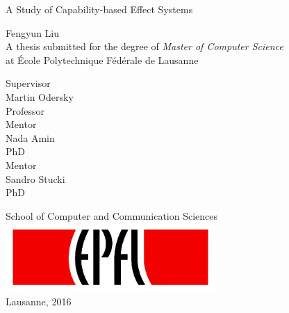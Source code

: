 \begin{titlepage}

  \begin{center}

    \vspace*{3\baselineskip}
    {\Large A Study of Capability-based Effect Systems\\[2cm] }

    \noindent
    Fengyun Liu \\[2cm]

    \noindent
    A thesis submitted for the degree of \emph{Master of Computer
      Science} \\
    at École Polytechnique Fédérale de Lausanne \\[1.8cm]

    \noindent
    \begin{multicols}{3}
    Supervisor \\
    Martin Odersky \\
    Professor \\
    \vfill
    \columnbreak
    Mentor \\
    Nada Amin \\
    PhD \\
    \vfill
    \columnbreak
    Mentor \\
    Sandro Stucki\\
    PhD \\
    \end{multicols}

    \vspace*{3\baselineskip}

    \noindent
    {School of Computer and Communication Sciences \\[1cm]}
    \includegraphics[width=0.6\textwidth]{img/epfl}~\\[1cm]
    \noindent
    Lausanne, 2016 \\[1cm]



  \end{center}

\end{titlepage}
